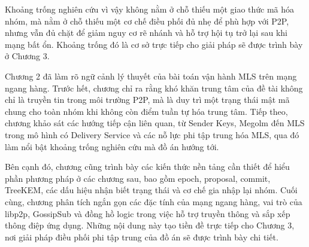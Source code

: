 \documentclass[../DoAn.tex]{subfiles}
\begin{document}
Khoảng trống nghiên cứu vì vậy không nằm ở chỗ thiếu một giao thức mã hóa nhóm, mà nằm ở chỗ thiếu một cơ chế điều phối đủ nhẹ để phù hợp với P2P, nhưng vẫn đủ chặt để giảm nguy cơ rẽ nhánh và hỗ trợ hội tụ trở lại sau khi mạng bất ổn. Khoảng trống đó là cơ sở trực tiếp cho giải pháp sẽ được trình bày ở Chương 3.

Chương 2 đã làm rõ ngữ cảnh lý thuyết của bài toán vận hành MLS trên mạng ngang hàng. Trước hết, chương chỉ ra rằng khó khăn trung tâm của đề tài không chỉ là truyền tin trong môi trường P2P, mà là duy trì một trạng thái mật mã chung cho toàn nhóm khi không còn điểm tuần tự hóa trung tâm. Tiếp theo, chương khảo sát các hướng tiếp cận liên quan, từ Sender Keys, Megolm đến MLS trong mô hình có Delivery Service và các nỗ lực phi tập trung hóa MLS, qua đó làm nổi bật khoảng trống nghiên cứu mà đồ án hướng tới.

Bên cạnh đó, chương cũng trình bày các kiến thức nền tảng cần thiết để hiểu phần phương pháp ở các chương sau, bao gồm epoch, proposal, commit, TreeKEM, các dấu hiệu nhận biết trạng thái và cơ chế gia nhập lại nhóm. Cuối cùng, chương phân tích ngắn gọn các đặc tính của mạng ngang hàng, vai trò của libp2p, GossipSub và đồng hồ logic trong việc hỗ trợ truyền thông và sắp xếp thông điệp ứng dụng. Những nội dung này tạo tiền đề trực tiếp cho Chương 3, nơi giải pháp điều phối phi tập trung của đồ án sẽ được trình bày chi tiết.
\end{document}
